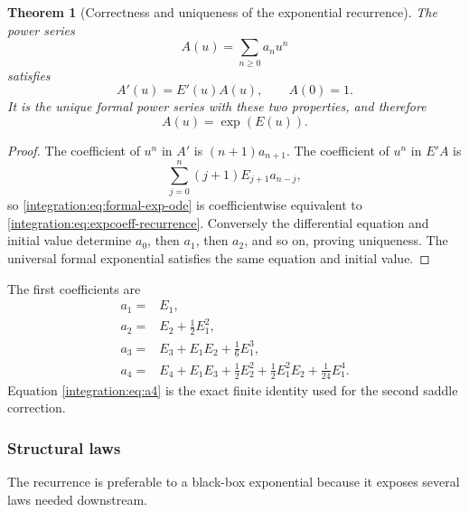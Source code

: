 \documentclass[11pt,oneside]{article}
\newtheorem{theorem}{Theorem}[section]
\theoremstyle{definition}
\theoremstyle{remark}
\begin{document}
\begin{theorem}[Correctness and uniqueness of the exponential recurrence]
\label{integration:thm:expcoeff-correctness}
The power series
\begin{equation}
 A(u)=\sum_{n\ge0}a_nu^n
 \label{integration:eq:formal-mass-series}
\end{equation}
satisfies
\begin{equation}
 A'(u)=E'(u)A(u),
 \qquad
 A(0)=1.
 \label{integration:eq:formal-exp-ode}
\end{equation}
It is the unique formal power series with these two properties, and therefore
\begin{equation}
 A(u)=\exp(E(u)).
 \label{integration:eq:formal-exp-identification}
\end{equation}
\end{theorem}

\begin{proof}
The coefficient of $u^n$ in $A'$ is $(n+1)a_{n+1}$.  The coefficient of $u^n$ in $E'A$ is
\[
 \sum_{j=0}^{n}(j+1)E_{j+1}a_{n-j},
\]
so \eqref{integration:eq:formal-exp-ode} is coefficientwise equivalent to
\eqref{integration:eq:expcoeff-recurrence}.  Conversely the differential equation and initial value
determine $a_0$, then $a_1$, then $a_2$, and so on, proving uniqueness.  The universal
formal exponential satisfies the same equation and initial value.
\end{proof}

The first coefficients are
\begin{align}
 a_1={}&E_1,                                                  \label{integration:eq:a1}\\
 a_2={}&E_2+\frac12E_1^2,                                    \label{integration:eq:a2}\\
 a_3={}&E_3+E_1E_2+\frac16E_1^3,                             \label{integration:eq:a3}\\
 a_4={}&E_4+E_1E_3+\frac12E_2^2
       +\frac12E_1^2E_2+\frac1{24}E_1^4.                    \label{integration:eq:a4}
\end{align}
Equation \eqref{integration:eq:a4} is the exact finite identity used for the second saddle correction.

\subsubsection{Structural laws}

The recurrence is preferable to a black-box exponential because it exposes several laws
needed downstream.
\end{document}
